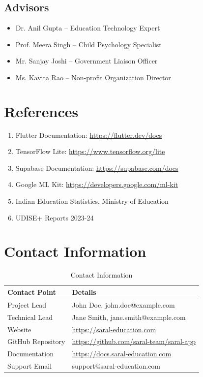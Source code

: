 \documentclass[12pt,a4paper]{article}
\begin{document}
\subsection{Advisors}
\begin{itemize}[leftmargin=*, itemsep=0.2em]
    \item Dr. Anil Gupta -- Education Technology Expert
    \item Prof. Meera Singh -- Child Psychology Specialist
    \item Mr. Sanjay Joshi -- Government Liaison Officer
    \item Ms. Kavita Rao -- Non-profit Organization Director
\end{itemize}

\section{References}
\begin{enumerate}[leftmargin=*, itemsep=0.2em]
    \item Flutter Documentation: \url{https://flutter.dev/docs}
    \item TensorFlow Lite: \url{https://www.tensorflow.org/lite}
    \item Supabase Documentation: \url{https://supabase.com/docs}
    \item Google ML Kit: \url{https://developers.google.com/ml-kit}
    \item Indian Education Statistics, Ministry of Education
    \item UDISE+ Reports 2023-24
\end{enumerate}

\section{Contact Information}
\begin{table}[H]
\centering
\small
\begin{tabularx}{\textwidth}{|l|X|}
\hline
\rowcolor{lightgray}
\textbf{Contact Point} & \textbf{Details} \\
\hline
Project Lead & John Doe, john.doe@example.com \\
\hline
Technical Lead & Jane Smith, jane.smith@example.com \\
\hline
Website & \url{https://saral-education.com} \\
\hline
GitHub Repository & \url{https://github.com/saral-team/saral-app} \\
\hline
Documentation & \url{https://docs.saral-education.com} \\
\hline
Support Email & support@saral-education.com \\
\hline
\end{tabularx}
\caption{Contact Information}
\end{table}
\end{document}

